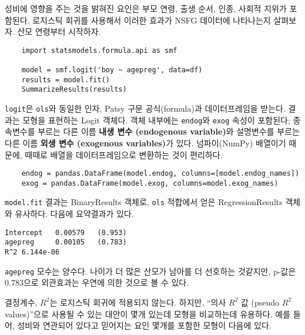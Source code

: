 성비에 영향을 주는 것을 밝혀진 요인은 부모 연령, 출생 순서, 인종, 사회적 지위가 포함된다. 로지스틱 회귀를 사용해서 이러한 효과가 NSFG 데이터에 나타나는지 살펴보자. 산모 연령부터 시작하자.


\begin{verbatim}
    import statsmodels.formula.api as smf

    model = smf.logit('boy ~ agepreg', data=df)
    results = model.fit()
    SummarizeResults(results)
\end{verbatim}

{\tt logit}은 {\tt ols}와 동일한 인자, Patsy 구문 공식(formula)과 데이터프레임을 받는다.
결과는 모형을 표현하는 Logit 객체다.
객체 내부에는 {\tt endog}와 {\tt exog} 속성이 포함된다; 종속변수를 부르는 다른 이름 {\bf 내생 변수 (endogenous variable)}와 설명변수를 부르는 다른 이름 {\bf 외생 변수 (exogenous variables)}가 있다.
넘파이(NumPy) 배열이기 때문에, 때때로 배열을 데이터프레임으로 변환하는 것이 편리하다.

\begin{verbatim}
    endog = pandas.DataFrame(model.endog, columns=[model.endog_names])
    exog = pandas.DataFrame(model.exog, columns=model.exog_names)
\end{verbatim}

{\tt model.fit} 결과는 BinaryResults 객체로, {\tt ols} 적합에서 얻은 RegressionResults 객체와 유사하다.
다음에 요약결과가 있다.

\begin{verbatim}
Intercept   0.00579   (0.953)
agepreg     0.00105   (0.783)
R^2 6.144e-06
\end{verbatim}

{\tt agepreg} 모수는 양수다. 나이가 더 많은 산모가 남아를 더 선호하는 것같지만, p-값은 0.783으로 외관효과는 우연에 의한 것으로 볼 수 있다.

결정계수, $R^2$는 로지스틱 회귀에 적용되지 않는다.
하지만, ``의사 $R^2$ 값 (pseudo $R^2$ values)''으로 사용될 수 있는 대안이 몇개 있는데 모형을 비교하는데 유용하다.
예를 들어, 성비와 연관되어 있다고 믿어지는 요인 몇개를 포함한 모형이 다음에 있다.

